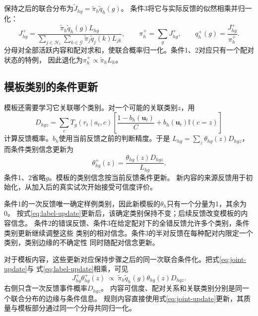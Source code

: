 \documentclass[11pt,a4paper]{article}
\numberwithin{equation}{section}
\newcommand{\ind}{\mathbb{I}}
\begin{document}
保持之后的联合分布为$\widetilde J_{hg}=\widetilde\pi_h\widetilde q_h(g)$。
条件3将它与实际反馈的似然相乘并归一化：
\begin{equation}
J^+_{hg}=\frac{\widetilde\pi_h\widetilde q_h(g)L_{hg}}
{\sum_{j\in\mathcal H_t}\sum_{k\in\mathcal G}\widetilde\pi_j\widetilde q_j(k)L_{jk}},\qquad
\pi_h^+=\sum_gJ^+_{hg},\qquad q_h^+(g)=\frac{J^+_{hg}}{\pi_h^+}.
\label{eq:joint-update}
\end{equation}
分母对全部活跃内容和配对求和，使联合概率归一化。条件1、2对应只有一个配对状态的特例，
因此退化为$\pi_h^+\propto\widetilde\pi_hL_h$。

\subsection{模板类别的条件更新}
模板还需要学习它关联哪个类别。对一个可能的关联类别$z$，用
\begin{equation}
D_{hgz}=\sum_cT_g(r_t\mid a_t,c)
\left[\frac{1-b_h(\bm u_t)}C+b_h(\bm u_t)\ind(c=z)\right]
\label{eq:label-likelihood}
\end{equation}
计算反馈概率。$b_h$使用当前反馈之前的判断精度。于是
$L_{hg}=\sum_z\theta_{hg}(z)D_{hgz}$，而条件类别信念更新为
\begin{equation}
\theta^+_{hg}(z)=\frac{\theta_{hg}(z)D_{hgz}}{L_{hg}}.
\label{eq:label-update}
\end{equation}
条件1、2省略$g$。模板的类别信念按当前反馈条件更新。
新内容的来源反馈用于初始化，从加入后的真实试次开始接受可信度评价。

条件1的一次反馈唯一确定样例类别，因此新模板的$\theta_h$只有一个分量为1，其余为0。
按式\eqref{eq:label-update}更新后，该确定类别保持不变；后续反馈改变模板的内容信念。
条件2的错误反馈、条件3在给定配对下的全错反馈允许多个类别，条件类别更新继续调整这些
类别的相对信念。条件3的半对反馈在每种配对内限定一个类别，类别边缘的不确定性
同时随配对信念更新。

对于模板内容，这些更新对应保持步骤之后的同一次联合条件化。把式\eqref{eq:joint-update}与
式\eqref{eq:label-update}相乘，可见
\begin{equation}
J^+_{hg}\theta^+_{hg}(z)\ \propto\
\widetilde\pi_h\widetilde q_h(g)\theta_{hg}(z)D_{hgz}.
\label{eq:one-event}
\end{equation}
右侧只含一次反馈事件概率$D_{hgz}$。
内容可信度、配对关系和关联类别分别是同一个联合分布的边缘与条件信息。
规则内容直接使用式\eqref{eq:joint-update}更新，其质量与模板部分通过同一个分母共同归一化。
\end{document}
